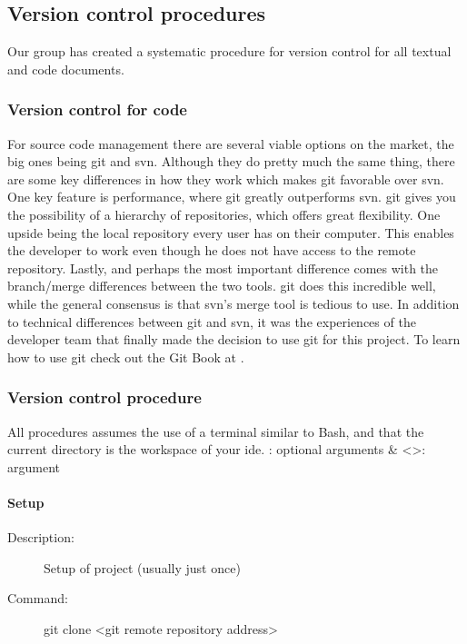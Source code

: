 

\subsection{Version control procedures}
Our group has created a systematic procedure for version control for all textual  and code documents. 

\subsubsection{Version control for code}
For source code management there are several viable options on the market, the big ones being \gls{git} and \gls{svn}. Although they do pretty much the same thing, there are some key differences in how they work which makes \gls{git} favorable over \gls{svn}. One key feature is performance, where \gls{git} greatly outperforms \gls{svn}. \gls{git} gives you the possibility of a hierarchy of repositories, which offers great flexibility. One upside being the local repository every user has on their computer. This enables the developer to work even though he does not have access to the remote repository. Lastly, and perhaps the most important difference comes with the branch/merge differences between the two tools. \gls{git} does this incredible well, while the general consensus is that \gls{svn}’s merge tool is tedious to use.  
\newline
\newline
In addition to technical differences between \gls{git} and \gls{svn}, it was the experiences of the developer team that finally made the decision to use \gls{git} for this project. To learn how to use \gls{git} check out the Git Book at \cite{bib:gitbook}.

\newpage

\subsubsection{Version control procedure}
All procedures assumes the use of a terminal similar to Bash, and that the current directory is the workspace of your \gls{ide}.
\newline
\newline
[]: optional arguments \& <>: argument

\paragraph{Setup}
\begin{description}
\item[Description:] Setup of project (usually just once)
\item[Command:] git clone <git remote repository address>
\end{description}

